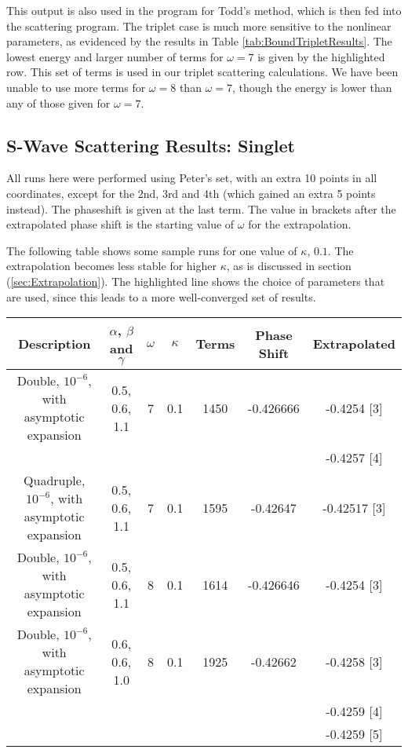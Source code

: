 \documentclass[Dissertation.tex]{subfiles}
\begin{document}
This output is also used in the program for Todd's method, which is then fed into the scattering program.  The triplet case is much more sensitive to the nonlinear parameters, as evidenced by the results in Table \ref{tab:BoundTripletResults}.  The lowest energy and larger number of terms for $\omega = 7$ is given by the highlighted row.  This set of terms is used in our triplet scattering calculations.  We have been unable to use more terms for $\omega = 8$ than $\omega = 7$, though the energy is lower than any of those given for $\omega = 7$.


\subsection{S-Wave Scattering Results: Singlet}
All runs here were performed using Peter's set, with an extra 10 points in all coordinates, except for the 2nd, 3rd and 4th (which gained an extra 5 points instead).  The phaseshift is given at the last term.  The value in brackets after the extrapolated phase shift is the starting value of $\omega$ for the extrapolation.

The following table shows some sample runs for one value of $\kappa$, $0.1$.  The extrapolation becomes less stable for higher $\kappa$, as is discussed in section (\ref{sec:Extrapolation}).  The highlighted line shows the choice of parameters that are used, since this leads to a more well-converged set of results.

\begin{center}
\begin{tabular}{|c|c|c|c|c|c|c|}
\hline
Description & $\alpha$, $\beta$ and $\gamma$ & $\omega$ & $\kappa$ & Terms & Phase Shift & Extrapolated\\
\hline
\rowcolor{LightCyan} Double, $10^{-6}$, with asymptotic expansion & 0.5, 0.6, 1.1 & 7 & 0.1 & 1450 & -0.426666 & -0.4254 [3] \\
& & & & & & -0.4257 [4] \\
Quadruple, $10^{-6}$, with asymptotic expansion & 0.5, 0.6, 1.1 & 7 & 0.1 & 1595 & -0.42647 & -0.42517 [3] \\
Double, $10^{-6}$, with asymptotic expansion & 0.5, 0.6, 1.1 & 8 & 0.1 & 1614 & -0.426646 & -0.4254 [3] \\
Double, $10^{-6}$, with asymptotic expansion & 0.6, 0.6, 1.0 & 8 & 0.1 & 1925 & -0.42662 & -0.4258 [3] \\
& & & & & & -0.4259 [4] \\
& & & & & & -0.4259 [5] \\
\hline
\end{tabular}
\end{center}
\end{document}
